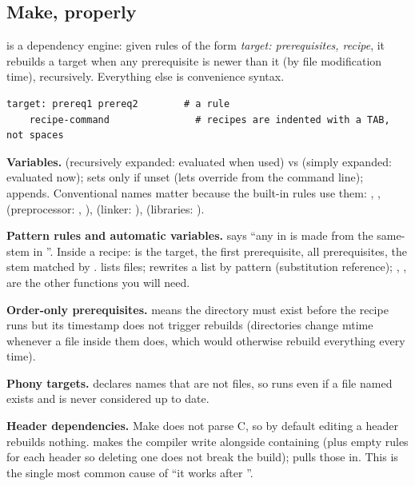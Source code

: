 \subsection{Make, properly}

 is a dependency engine: given rules of the form \emph{target: prerequisites, recipe}, it rebuilds a target when any prerequisite is newer than it (by file modification time), recursively. Everything else is convenience syntax.

\begin{lstlisting}[style=plain]
target: prereq1 prereq2        # a rule
	recipe-command               # recipes are indented with a TAB, not spaces
\end{lstlisting}

\textbf{Variables.}  (recursively expanded: evaluated when used) vs  (simply expanded: evaluated now);  sets only if unset (lets  override from the command line);  appends. Conventional names matter because the built-in rules use them: , ,  (preprocessor: , ),  (linker: ),  (libraries: ).

\textbf{Pattern rules and automatic variables.}  says ``any  in  is made from the same-stem  in ''. Inside a recipe:  is the target, \code{\$<} the first prerequisite, \code{\$\^{}} all prerequisites, \code{\$*} the stem matched by \code{\%}.  lists files;  rewrites a list by pattern (substitution reference); , ,  are the other functions you will need.

\textbf{Order-only prerequisites.}  means the directory must exist before the recipe runs but its timestamp does not trigger rebuilds (directories change mtime whenever a file inside them does, which would otherwise rebuild everything every time).

\textbf{Phony targets.}  declares names that are not files, so  runs even if a file named  exists and is never considered up to date.

\textbf{Header dependencies.} Make does not parse C, so by default editing a header rebuilds nothing.  makes the compiler write  alongside  containing  (plus empty rules for each header so deleting one does not break the build);  pulls those in. This is the single most common cause of ``it works after ''.

